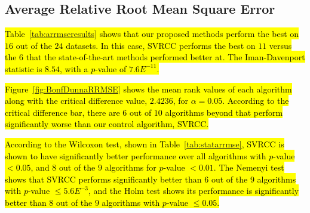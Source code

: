 \documentclass[preprint,12pt]{elsarticle}
\begin{document}
\subsection{Average Relative Root Mean Square Error}\label{subsec:arrmse}
\hl{Table~{\ref{tab:arrmseresults}} shows that our proposed methods perform the best on $16$ out of the $24$ datasets. In this case, SVRCC performs the best on $11$ versus the $6$ that the state-of-the-art methods performed better at. The Iman-Davenport statistic is $8.54$, with a $p$-value of $7.6E^{-11}$.}

\hl{Figure~{\ref{fig:BonfDunnaRRMSE}} shows the mean rank values of each algorithm along with the critical difference value, $2.4236$, for $\alpha = 0.05$. According to the critical difference bar, there are $6$ out of $10$ algorithms beyond that perform significantly worse than our control algorithm, SVRCC.}

\hl{According to the Wilcoxon test, shown in Table~{\ref{tab:statarrmse}}, SVRCC is shown to have significantly better performance over all algorithms with $p$-value $< 0.05$, and $8$ out of the $9$ algorithms for $p$-value $< 0.01$. The Nemenyi test shows that SVRCC performs significantly better than $6$ out of the $9$ algorithms with $p$-value $\leq 5.6E^{-3}$, and the Holm test shows its performance is significantly better than $8$ out of the $9$ algorithms with $p$-value $\leq 0.05$.}
\end{document}
